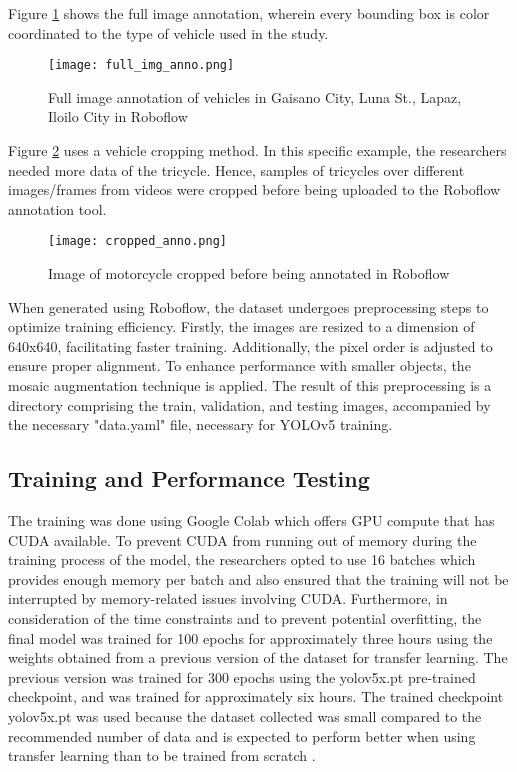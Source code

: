 Figure \ref{fig:full_img_anno} shows the full image annotation, wherein every bounding box is color coordinated to the type of vehicle used in the study.

\begin{figure}[!htbp]
	\texttt{[image: full\_img\_anno.png]}
	\caption{Full image annotation of vehicles in Gaisano City, Luna St., Lapaz, Iloilo City in Roboflow}
	\label{fig:full_img_anno}
\end{figure}
\FloatBarrier

Figure \ref{fig:cropped_anno} uses a vehicle cropping method. In this specific example, the researchers needed more data of the tricycle. Hence, samples of tricycles over different images/frames from videos were cropped before being uploaded to the Roboflow annotation tool. 

\begin{figure}[!htbp]
	\texttt{[image: cropped\_anno.png]}
	\caption{Image of motorcycle cropped before being annotated in Roboflow}
	\label{fig:cropped_anno}
\end{figure}
\FloatBarrier

When generated using Roboflow, the dataset undergoes preprocessing steps to optimize training efficiency. Firstly, the images are resized to a dimension of 640x640, facilitating faster training. Additionally, the pixel order is adjusted to ensure proper alignment. To enhance performance with smaller objects, the mosaic augmentation technique is applied. The result of this preprocessing is a directory comprising the train, validation, and testing images, accompanied by the necessary "data.yaml" file, necessary for YOLOv5 training.


\newpage

\subsection {Training and Performance Testing}
The training was done using Google Colab which offers GPU compute that has CUDA available. To prevent CUDA from running out of memory during the training process of the model, the researchers opted to use 16 batches which provides enough memory per batch and also ensured that the training will not be interrupted by memory-related issues involving CUDA. Furthermore, in consideration of the time constraints and to prevent potential overfitting, the final model was trained for 100 epochs for approximately three hours using the weights obtained from a previous version of the dataset for transfer learning. The previous version was trained for 300 epochs using the yolov5x.pt pre-trained checkpoint, and was trained for approximately six hours. The trained checkpoint yolov5x.pt was used because the dataset collected was small compared to the recommended number of data \cite{Jocher_Waxmann_2022} and is expected to perform better when using transfer learning than to be trained from scratch \cite{Lihi_Gur_Arie_2023}.

